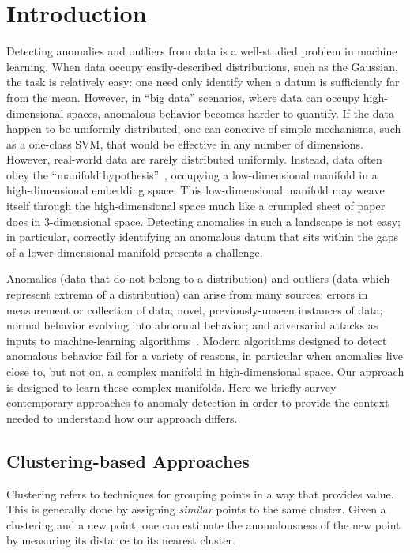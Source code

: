 \section{Introduction}
\label{sec:introduction}

Detecting anomalies and outliers from data is a well-studied problem in machine learning.
When data occupy easily-described distributions, such as the Gaussian, the task is relatively easy: one need only identify when a datum is sufficiently far from the mean.
However, in ``big data'' scenarios, where data can occupy high-dimensional spaces, anomalous behavior becomes harder to quantify.
If the data happen to be uniformly distributed, one can conceive of simple mechanisms, such as a one-class SVM, that would be effective in any number of dimensions.
However, real-world data are rarely distributed uniformly.
Instead, data often obey the ``manifold hypothesis''~\cite{fefferman2016testing}, occupying a low-dimensional manifold in a high-dimensional embedding space.
This low-dimensional manifold may weave itself through the high-dimensional space much like a crumpled sheet of paper does in 3-dimensional space.
Detecting anomalies in such a landscape is not easy;
in particular, correctly identifying an anomalous datum that sits within the gaps of a lower-dimensional manifold presents a challenge.

Anomalies (data that do not belong to a distribution) and outliers (data which represent extrema of a distribution) can arise from many sources:
errors in measurement or collection of data;
novel, previously-unseen instances of data;
normal behavior evolving into abnormal behavior;
and adversarial attacks as inputs to machine-learning algorithms~\cite{elsayed2018adversarial}.
Modern algorithms designed to detect anomalous behavior fail for a variety of reasons, in particular when anomalies live close to, but not on, a complex manifold in high-dimensional space.
Our approach is designed to learn these complex manifolds.
Here we briefly survey contemporary approaches to anomaly detection in order to provide the context needed to understand how our approach differs.

\subsection{Clustering-based Approaches}
\label{subsec:related-works:clustering-based-approaches}

Clustering refers to techniques for grouping points in a way that provides value.
This is generally done by assigning \textit{similar} points to the same cluster.
Given a clustering and a new point, one can estimate the anomalousness of the new point by measuring its distance to its nearest cluster.

